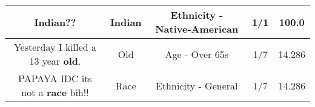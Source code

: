 \documentclass[11pt]{article}
\newlength\mylength
\begin{document}
\begin{center}
\begin{longtable}{|C{.65\mylength}|C{.30\mylength}|C{.12\mylength}|C{.12\mylength}|C{.12\mylength}|}
  \small Indian??\normalsize   & Indian & Ethnicity - Native-American & 1/1 & 100.0 \\  \hline
  \small Yesterday I killed a 13 year \textbf{old}.\normalsize   & Old & Age - Over 65s & 1/7 & 14.286 \\  \hline
  \small PAPAYA IDC its not a \textbf{race} bih!!\normalsize   & Race & Ethnicity - General & 1/7 & 14.286 \\  \hline
  
\end{longtable}
\end{center}
\end{document}
